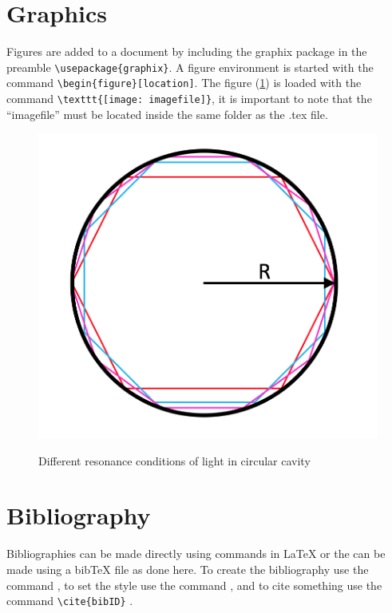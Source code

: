 \documentclass{article} 	%
\numberwithin{equation}{section}
\begin{document}
	\section{Graphics}
	Figures are added to a document by including the graphix package in the preamble \verb|\usepackage{graphix}|. A figure environment is started with the command \verb|\begin{figure}[location]|.  The figure (\ref{fig:workshop_image}) is loaded with the command \verb|\texttt{[image: imagefile]}|, it is important to note that the ``imagefile'' must be located inside the same folder as the .tex file.
	\begin{figure}[htb]			%
		\centering
		\includegraphics[width=.4\textwidth]{workshop_image}
		\caption{Different resonance conditions of light in circular cavity} \cite{frenkel_fine_2013}  \label{fig:workshop_image}
	\end{figure}

	\section{Bibliography}
	Bibliographies can be made directly using commands in \LaTeX{} or the can be made using a bib\TeX{} file as done here.  To create the bibliography use the command \verb||, to set the style use the command \verb||, and to cite something use the command \verb|\cite{bibID}| \cite{frenkel_-chip_2016}.
	
	
\end{document}
